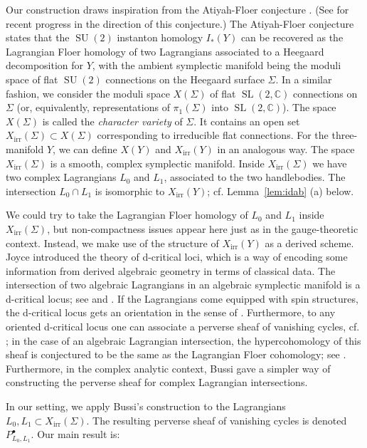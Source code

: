 \documentclass [11pt]{amsart}
\theoremstyle{remark}
\def\cc {{\mathbb{C}}}
\def\sl {{\operatorname{SL}(2, \cc)}}
\def\su {{\operatorname{SU}(2)}}
\def\Char {X}
\def\CharIrr {\Char_{\operatorname{irr}}}
\begin{document}
Our construction draws inspiration from the Atiyah-Floer conjecture \cite{AtiyahFloer}. (See \cite{DaemiFukaya} for recent progress in the direction of this conjecture.) The Atiyah-Floer conjecture states that the  $\su$ instanton homology $I_*(Y)$ can be recovered as the Lagrangian Floer homology of two Lagrangians associated to a Heegaard decomposition for $Y$, with the ambient symplectic manifold being the moduli space of flat $\su$ connections on the Heegaard surface $\Sigma$. In a similar fashion, we consider the moduli space $\Char(\Sigma)$ of flat $\sl$ connections on $\Sigma$ (or, equivalently, representations of $\pi_1(\Sigma)$ into $\sl$). The space $\Char(\Sigma)$ is called the {\em character variety} of $\Sigma$. It contains an open set $\CharIrr(\Sigma) \subset \Char(\Sigma)$ corresponding to irreducible flat connections. For the three-manifold $Y$, we can define $\Char(Y)$ and $\CharIrr(Y)$ in an analogous way.  The space $\CharIrr(\Sigma)$ is a smooth, complex symplectic manifold. Inside $\CharIrr(\Sigma)$ we have two complex Lagrangians $L_0$ and $L_1$, associated to the two handlebodies.  The intersection $L_0 \cap L_1$ is isomorphic to $\CharIrr(Y)$; cf. Lemma~\ref{lem:idab} (a) below.

We could try to take the Lagrangian Floer homology of $L_0$ and $L_1$ inside $\CharIrr(\Sigma)$, but non-compactness issues appear here just as in the gauge-theoretic context. Instead, we make use of the structure of $\CharIrr(Y)$ as a derived scheme. Joyce \cite{Joyce} introduced the theory of d-critical loci, which is a way of encoding some information from derived algebraic geometry in terms of classical  data. The intersection of two algebraic Lagrangians in an algebraic symplectic manifold is a d-critical locus; see \cite[Corollary 2.10]{PTVV} and \cite[Corollary 6.8]{BBJ}. If the Lagrangians come equipped with spin structures, the d-critical locus gets an orientation in the sense of \cite[Section 2.5]{Joyce}. Furthermore, to any oriented d-critical locus one can associate a perverse sheaf of vanishing cycles, cf. \cite{BBDJS}; in the case of an algebraic Lagrangian intersection, the hypercohomology of this sheaf is conjectured to be the same as the Lagrangian Floer cohomology; see \cite[Remark 6.15]{BBDJS}. Furthermore, in the complex analytic context, Bussi \cite{Bussi} gave a simpler way of constructing the perverse sheaf for complex Lagrangian intersections. 

In our setting, we apply Bussi's construction to the Lagrangians $L_0, L_1 \subset \CharIrr(\Sigma)$. The resulting perverse sheaf of vanishing cycles is denoted $P^{\bullet}_{L_0, L_1}$. Our main result is:
\end{document}
